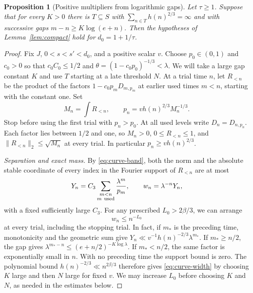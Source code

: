 \documentclass[11pt,a4paper,reqno]{amsart}
\newtheorem{proposition}[theorem]{Proposition}
\theoremstyle{definition}
\theoremstyle{remark}
\numberwithin{equation}{section}
\begin{document}
\begin{proposition}[Positive multipliers from logarithmic gaps]
\label{prop:curve-compensation}
Let \(\tau\ge1\). Suppose that for every \(K>0\) there is
\(T\subseteq S\) with \(\sum_{n\in T}h(n)^{2/3}=\infty\) and with
successive gaps \(m-n\ge K\log(e+n)\).
Then the hypotheses of Lemma~\ref{lem:compact} hold for \(d_0=1+1/\tau\).
\end{proposition}
\begin{proof}
Fix \(J\), \(0<s<s'<d_0\), and a positive scalar \(v\). Choose
\(p_0\in(0,1)\) and \(c_0>0\) so that \(c_0 C_0\le1/2\) and
\(\theta=(1-c_0p_0)^{-1/3}<\lambda\).
We will take a large gap constant \(K\) and use \(T\) starting at a
late threshold \(N\). At a trial time \(n\), let \(R_{<n}\) be the
product of the factors \(1-c_0p_m D_{m,p_m}\) at earlier used times
\(m<n\), starting with the constant one. Set
\begin{equation}\label{eq:curve-adapt}
        M_n=\int R_{<n},\qquad
        p_n=v h(n)^{2/3}M_n^{-1/3}.
\end{equation}
Stop before using the first trial with \(p_n>p_0\). At all used
levels write \(D_n=D_{n,p_n}\). Each factor lies between \(1/2\)
and one, so \(M_n>0\), \(0\le R_{<n}\le1\), and
\(\|R_{<n}\|_2\le\sqrt{M_n}\) at every trial. In particular
\(p_n\ge v h(n)^{2/3}\).

\medskip
\noindent\emph{Separation and exact mass.}
By \eqref{eq:curve-band}, both the norm and the absolute stable
coordinate of every index in the Fourier support of \(R_{<n}\) are
at most
\[
        Y_n=C_3\sum_{\substack{m<n\\m\ {\rm used}}}\frac{\lambda^m}{p_m},
        \qquad w_n=\lambda^{-n}Y_n ,
\]
with a fixed sufficiently large \(C_3\). For any prescribed
\(L_0>2\beta/3\), we can arrange
\begin{equation}\label{eq:curve-width}
                         w_n\le n^{-L_0}
\end{equation}
at every trial, including the stopping trial. In fact, if \(m_*\) is
the preceding time, monotonicity and the geometric sum give
\(Y_n\ll v^{-1}h(n)^{-2/3}\lambda^{m_*}\).
If \(m_*\ge n/2\), the gap gives
\(\lambda^{m_*-n}\le(e+n/2)^{-K\log\lambda}\).
If \(m_*<n/2\), the same factor is exponentially small in \(n\).
With no preceding time the support bound is zero. The polynomial
bound \(h(n)^{-2/3}\ll n^{2\beta/3}\) therefore gives
\eqref{eq:curve-width} by choosing \(K\) large and then \(N\) large
for fixed \(v\). We may increase \(L_0\) before choosing \(K\) and
\(N\), as needed in the estimates below.


\end{proof}
\end{document}
